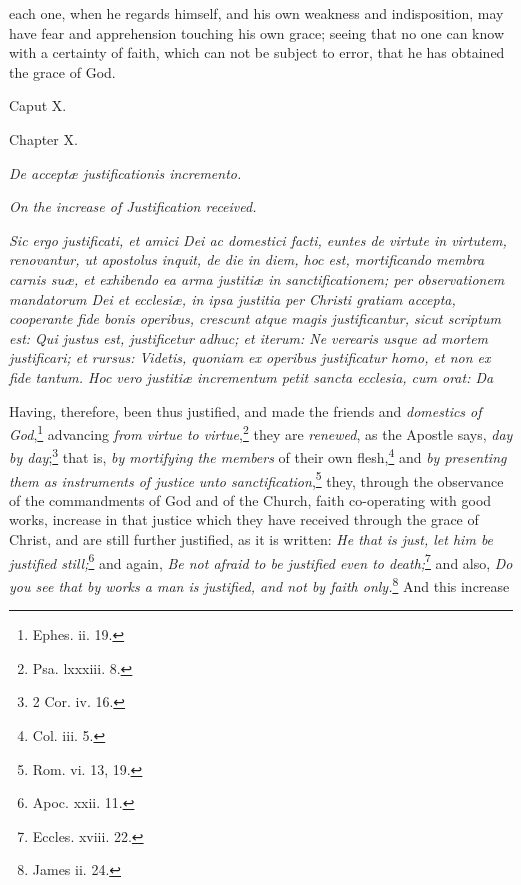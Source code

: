 each one, when he regards himself, and his own weakness and indisposition, may have fear and apprehension touching his own grace; seeing that no one can know with a certainty of faith, which can not be subject to error, that he has obtained the grace of God.

Caput X.

Chapter X.

\emph{De acceptæ justificationis incremento.}

\emph{On the increase of Justification received.}

\emph{Sic ergo justificati, et amici Dei ac domestici facti, euntes de virtute in virtutem, renovantur, ut apostolus inquit, de die in diem, hoc est, mortificando membra carnis suæ, et exhibendo ea arma justitiæ in sanctificationem; per observationem mandatorum Dei et ecclesiæ, in ipsa justitia per Christi gratiam accepta, cooperante fide bonis operibus, crescunt atque magis justificantur, sicut scriptum est: Qui justus est, justificetur adhuc; et iterum: Ne verearis usque ad mortem justificari; et rursus: Videtis, quoniam ex operibus justificatur homo, et non ex fide tantum. Hoc vero justitiæ incrementum petit sancta ecclesia, cum orat: Da }

Having, therefore, been thus justified, and made the friends and \emph{domestics of God},\footnote{\par   Ephes. ii. 19.} advancing \emph{from virtue to virtue},\footnote{\par   Psa. lxxxiii. 8.} they are \emph{renewed}, as the Apostle says, \emph{day by day};\footnote{\par   2 Cor. iv. 16.} that is, \emph{by mortifying the members} of their own flesh,\footnote{\par   Col. iii. 5.} and \emph{by presenting them as instruments of justice unto sanctification},\footnote{\par   Rom. vi. 13, 19.} they, through the observance of the commandments of God and of the Church, faith co-operating with good works, increase in that justice which they have received through the grace of Christ, and are still further justified, as it is written: \emph{He that is just, let him be justified still;}\footnote{\par   Apoc. xxii. 11.} and again, \emph{Be not afraid to be justified even to death;}\footnote{\par   Eccles. xviii. 22.} and also, \emph{Do you see that by works a man is justified, and not by faith only.}\footnote{\par   James ii. 24.} And this increase

